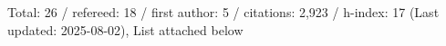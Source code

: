 Total: 26 / refereed: 18 / first author: 5 / citations: 2,923 / h-index: 17 (Last updated: 2025-08-02), List attached below